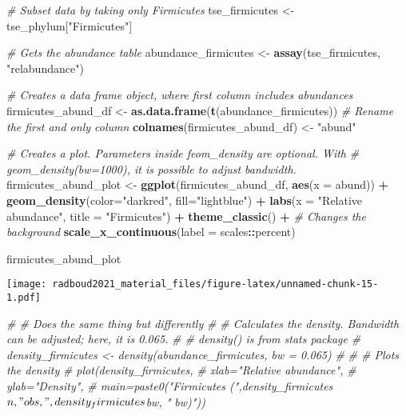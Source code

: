 \documentclass[
  oneside]{book}
\newenvironment{Shaded}{\begin{snugshade}}{\end{snugshade}}
\newcommand{\CommentTok}[1]{\textcolor[rgb]{0.56,0.35,0.01}{\textit{#1}}}
\newcommand{\DataTypeTok}[1]{\textcolor[rgb]{0.13,0.29,0.53}{#1}}
\newcommand{\KeywordTok}[1]{\textcolor[rgb]{0.13,0.29,0.53}{\textbf{#1}}}
\newcommand{\NormalTok}[1]{#1}
\newcommand{\OperatorTok}[1]{\textcolor[rgb]{0.81,0.36,0.00}{\textbf{#1}}}
\newcommand{\StringTok}[1]{\textcolor[rgb]{0.31,0.60,0.02}{#1}}
\begin{document}
\begin{Shaded}
\begin{Highlighting}[]
\CommentTok{# Subset data by taking only Firmicutes}
\NormalTok{tse_firmicutes <-}\StringTok{ }\NormalTok{tse_phylum[}\StringTok{"Firmicutes"}\NormalTok{]}

\CommentTok{# Gets the abundance table}
\NormalTok{abundance_firmicutes <-}\StringTok{ }\KeywordTok{assay}\NormalTok{(tse_firmicutes, }\StringTok{"relabundance"}\NormalTok{)}

\CommentTok{# Creates a data frame object, where first column includes abundances}
\NormalTok{firmicutes_abund_df <-}\StringTok{ }\KeywordTok{as.data.frame}\NormalTok{(}\KeywordTok{t}\NormalTok{(abundance_firmicutes))}
\CommentTok{# Rename the first and only column}
\KeywordTok{colnames}\NormalTok{(firmicutes_abund_df) <-}\StringTok{ "abund"}

\CommentTok{# Creates a plot. Parameters inside feom_density are optional. With }
\CommentTok{# geom_density(bw=1000), it is possible to adjust bandwidth.}
\NormalTok{firmicutes_abund_plot <-}\StringTok{ }\KeywordTok{ggplot}\NormalTok{(firmicutes_abund_df, }\KeywordTok{aes}\NormalTok{(}\DataTypeTok{x =}\NormalTok{ abund)) }\OperatorTok{+}\StringTok{ }
\StringTok{  }\KeywordTok{geom_density}\NormalTok{(}\DataTypeTok{color=}\StringTok{"darkred"}\NormalTok{, }\DataTypeTok{fill=}\StringTok{"lightblue"}\NormalTok{) }\OperatorTok{+}\StringTok{ }
\StringTok{  }\KeywordTok{labs}\NormalTok{(}\DataTypeTok{x =} \StringTok{"Relative abundance"}\NormalTok{, }\DataTypeTok{title =} \StringTok{"Firmicutes"}\NormalTok{) }\OperatorTok{+}
\StringTok{  }\KeywordTok{theme_classic}\NormalTok{() }\OperatorTok{+}\StringTok{ }\CommentTok{# Changes the background}
\StringTok{  }\KeywordTok{scale_x_continuous}\NormalTok{(}\DataTypeTok{label =}\NormalTok{ scales}\OperatorTok{::}\NormalTok{percent)}

\NormalTok{firmicutes_abund_plot}
\end{Highlighting}
\end{Shaded}

\texttt{[image: radboud2021\_material\_files/figure-latex/unnamed-chunk-15-1.pdf]}

\begin{Shaded}
\begin{Highlighting}[]
\CommentTok{# # Does the same thing but differently}
\CommentTok{# # Calculates the density. Bandwidth can be adjusted; here, it is 0.065.}
\CommentTok{# # density() is from stats package}
\CommentTok{# density_firmicutes <- density(abundance_firmicutes, bw = 0.065)}
\CommentTok{# }
\CommentTok{# # Plots the density}
\CommentTok{# plot(density_firmicutes,}
\CommentTok{#      xlab="Relative abundance",}
\CommentTok{#      ylab="Density",}
\CommentTok{#      main=paste0("Firmicutes (",density_firmicutes$n, " obs, ", density_firmicutes$bw, " bw)"))}
\end{Highlighting}
\end{Shaded}
\end{document}
